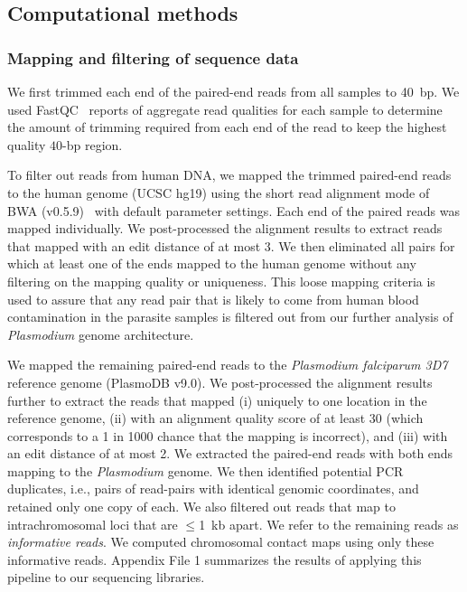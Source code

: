 \subsection{Computational methods}

\subsubsection{Mapping and filtering of sequence data}
\label{met:mapping}
We first trimmed each end of the paired-end reads from all samples to 40~bp.
We used FastQC~\citep{andrews:fastqc}
reports of aggregate read qualities for each sample to determine the amount
of trimming required from each end of the read to keep the highest quality
$40$-bp region.

To filter out reads from human DNA, we mapped the trimmed paired-end reads to
the human genome (UCSC hg19) using the short read alignment mode of BWA (v0.5.9)~\citep{li:fast} 
with default parameter settings. Each end of the paired reads was mapped
individually. We post-processed the alignment results to extract reads that
mapped with an edit distance of at most 3. We then eliminated all pairs for
which at least one of the ends mapped to the human genome without any filtering
on the mapping quality or uniqueness. This loose mapping criteria is used to
assure that any read pair that is likely to come from human blood contamination
in the parasite samples is filtered out from our further analysis of
{\em Plasmodium} genome architecture.

We mapped the remaining paired-end reads to the \emph{Plasmodium falciparum 3D7}
reference genome (PlasmoDB v9.0). We post-processed the alignment results further
to extract the reads that mapped (i) uniquely to one location in the reference
genome, (ii) with an alignment quality score of at least 30 (which corresponds to
a 1 in 1000 chance that the mapping is incorrect), and (iii) with an edit distance
of at most 2. We extracted the paired-end reads with both ends mapping to the
{\em Plasmodium} genome. We then identified potential PCR duplicates, i.e., pairs
of read-pairs with identical genomic coordinates, and retained only one copy of
each. We also filtered out reads that map to intrachromosomal loci that are
$\le$1~kb apart. We refer to the remaining reads as \emph{informative reads}. We
computed chromosomal contact maps using only these informative reads. Appendix
File 1 summarizes the results of applying this pipeline to our sequencing libraries.


